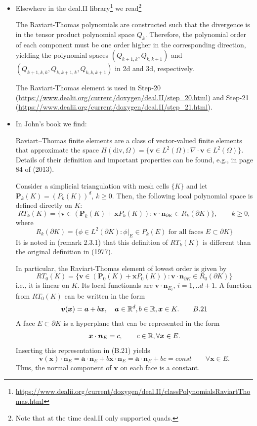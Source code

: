 \begin{itemize}
\item 
Elsewhere in the deal.II library\footnote{\url{https://www.dealii.org/current/doxygen/deal.II/classPolynomialsRaviartThomas.html}} we read\footnote{Note that at the time deal.II only supported quads.}
\begin{displayquote}
{\color{darkgray}
The Raviart-Thomas polynomials are constructed such that the divergence is 
in the tensor product polynomial space $Q_k$. Therefore, the polynomial order of each component 
must be one order higher in the corresponding direction, yielding the polynomial spaces 
$(Q_{k+1,k}, Q_{k,k+1})$ and $(Q_{k+1,k,k}, Q_{k,k+1,k}, Q_{k,k,k+1})$ in 2d and 3d, respectively. 
}
\end{displayquote}

The Raviart-Thomas element is used in Step-20 (\url{https://www.dealii.org/current/doxygen/deal.II/step_20.html}) and Step-21 (\url{https://www.dealii.org/current/doxygen/deal.II/step_21.html}).


\item
In John's book \cite{john16} we find:
\begin{displayquote}
{\color{darkgray}
Raviart–Thomas finite elements are a class of vector-valued finite elements that approximate the space
$H(\text{div},\Omega)=\{ {\bm v} \in L^2(\Omega): \nabla \cdot {\bm v} \in L^2(\Omega)  \}$.
Details of their definition and important properties can be
found, e.g., in page 84 of \textcite{bobf13} (2013).

Consider a simplicial triangulation with mesh cells $\{K\}$ and let ${\bm P}_k(K)=(P_k(K))^d$, $k\ge 0$.
Then, the following local polynomial space is defined directly on $K$:
\[
RT_k(K)=\{ {\bm v} \in ({\bm P}_k(K) + {\bm x} P_k(K)) : 
{\bm v}\cdot{\bm n}_{\partial K} \in R_k(\partial K)\},
\qquad k\ge 0,
\]
where
\[
R_k(\partial K)=\{ \phi \in L^2(\partial K): \phi|_E\in P_k(E) \text{ for all faces } E\subset \partial K \}
\]
It is noted in \textcite{bobf13} (remark 2.3.1) that this definition of $RT_k(K)$
is different than the original definition in \textcite{rath77} (1977).

In particular, the Raviart-Thomas element of lowest order is given by
\[
RT_0(K)=\{ {\bm v} \in ({\bm P}_0(K)+{\bm x} P_0(K)) : {\bm v} \cdot {\bm n}_{\partial K} \in R_0(\partial K)  \}
\]
i.e., it is linear on $K$. Its local functionals are ${\bm v} \cdot {\bm n}_{E_i}$, $i=1,..d+1$. 
A function from $RT_0(K)$ can be written in the form
\[
{\bm v}({\bm x}) = {\bm a} + b {\bm x}, \quad {\bm a}\in {\mathbb{R}}^d, b\in {\mathbb{R}}, {\bm x}\in K. \qquad B.21
\]
A face $E\subset \partial K$ is a hyperplane that can be represented in the form
\[
{\bm x}\cdot {\bm n}_E = c, \qquad c\in {\mathbb{R}}, \forall {\bm x} \in E.
\]
Inserting this representation in (B.21) yields
\[
{\bm v}({\bm x})\cdot {\bm n}_E = {\bm a}\cdot {\bm n}_E + b {\bm x} \cdot {\bm n}_E = {\bm a}\cdot {\bm n}_E + bc =const
\qquad \forall {\bm x}\in E.
\]
Thus, the normal component of ${\bm v}$ on each face is a constant.

}
\end{displayquote}
\end{itemize}

